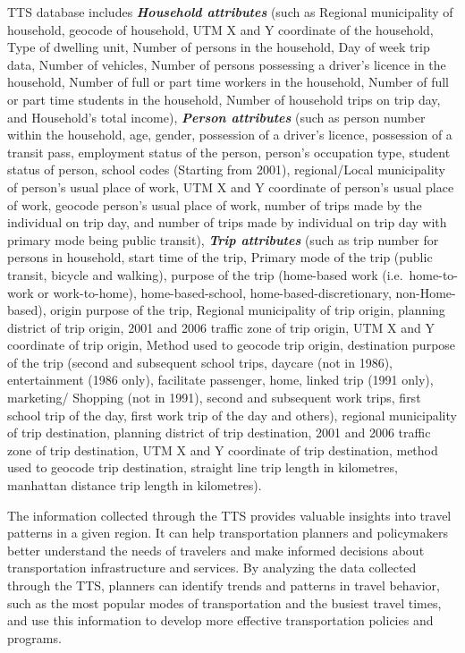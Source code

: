 \documentclass[12pt,twoside]{reedthesis}
\begin{document}
TTS database includes \textbf{\emph{Household attributes}} (such as Regional municipality of household, geocode of household, UTM X and Y coordinate of the household, Type of dwelling unit, Number of persons in the household, Day of week trip data, Number of vehicles, Number of persons possessing a driver's licence in the household, Number of full or part time workers in the household, Number of full or part time students in the household, Number of household trips on trip day, and Household's total income), \textbf{\emph{Person attributes}} (such as person number within the household, age, gender, possession of a driver's licence, possession of a transit pass, employment status of the person, person's occupation type, student status of person, school codes (Starting from 2001), regional/Local municipality of person's usual place of work, UTM X and Y coordinate of person's usual place of work, geocode person's usual place of work, number of trips made by the individual on trip day, and number of trips made by individual on trip day with primary mode being public transit), \textbf{\emph{Trip attributes}} (such as trip number for persons in household, start time of the trip, Primary mode of the trip (public transit, bicycle and walking), purpose of the trip (home-based work (i.e.~home-to-work or work-to-home), home-based-school, home-based-discretionary, non-Home-based), origin purpose of the trip, Regional municipality of trip origin, planning district of trip origin, 2001 and 2006 traffic zone of trip origin, UTM X and Y coordinate of trip origin, Method used to geocode trip origin, destination purpose of the trip (second and subsequent school trips, daycare (not in 1986), entertainment (1986 only), facilitate passenger, home, linked trip (1991 only), marketing/ Shopping (not in 1991), second and subsequent work trips, first school trip of the day, first work trip of the day and others), regional municipality of trip destination, planning district of trip destination, 2001 and 2006 traffic zone of trip destination, UTM X and Y coordinate of trip destination, method used to geocode trip destination, straight line trip length in kilometres, manhattan distance trip length in kilometres).

The information collected through the TTS provides valuable insights into travel patterns in a given region. It can help transportation planners and policymakers better understand the needs of travelers and make informed decisions about transportation infrastructure and services. By analyzing the data collected through the TTS, planners can identify trends and patterns in travel behavior, such as the most popular modes of transportation and the busiest travel times, and use this information to develop more effective transportation policies and programs.
\end{document}
